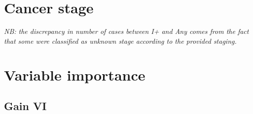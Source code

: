 \documentclass[english]{article}
\begin{document}
\newpage
\clearpage
\section{Cancer stage}

\textit{NB: the discrepancy in number of cases between I+ and Any comes from the fact that some were classified as unknown stage according to the provided staging. }











\newpage
\clearpage
\section{Variable importance}

\subsection{Gain VI}
\end{document}
